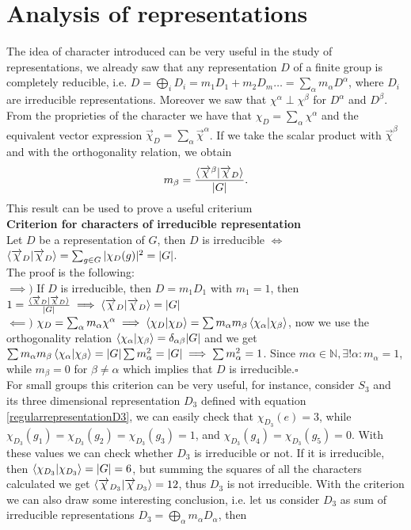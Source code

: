\documentclass[12pt]{book}
\theoremstyle{plain}
\theoremstyle{definition}
\theoremstyle{remark}
\begin{document}
\section{Analysis of representations}
The idea of character introduced can be very useful in the study of representations, we already saw that any representation $D$ of a finite group is completely reducible, i.e. $D = \bigoplus_i D_i = m_1 D_1 + m_2D_m \dots = \sum_\alpha m_\alpha D^\alpha$, where $D_i$ are irreducible representations. Moreover we saw that $\chi^\alpha \perp \chi^\beta$ for $D^\alpha$ and $D^\beta$. From the proprieties of the character we have that $\chi_D =\sum_\alpha \chi^\alpha$ and the equivalent vector expression $\overrightarrow{\chi}_D =\sum_\alpha \overrightarrow{\chi}^\alpha$. If we take the scalar product with $\overrightarrow{\chi}^\beta$ and with the orthogonality relation, we obtain
\[m_\beta = \frac{\braket{\overrightarrow{\chi}^\beta|\overrightarrow{\chi}_D}}{|G|}.\]
This result can be used to prove a useful criterium\\
\textbf{Criterion for characters of irreducible representation}\\Let $D$ be a representation of $G$, then $D$ is irreducible $\iff$ $\braket{\overrightarrow{\chi}_{D}|\overrightarrow{\chi}_{D}} = \sum_{g\in G}|\chi_D(g)|^2 = |G|$.\\ The proof is the following:\\
$\implies)$ If $D$ is irreducible, then $D = m_1 D_1$ with $m_1= 1$, then $1 = \frac{\braket{\overrightarrow{\chi}_D|\overrightarrow{\chi}_D}}{|G|} \implies \braket{\overrightarrow{\chi}_D|\overrightarrow{\chi}_D} = |G|$\\
$\impliedby)$ $\chi_D = \sum_\alpha m_\alpha\chi^\alpha \implies \braket{\chi_D|\chi_D} = \sum m_\alpha m_\beta \braket{\chi_\alpha|\chi_\beta}$, now we use the orthogonality relation $\braket{\chi_\alpha|\chi_\beta} = \delta_{\alpha\beta}|G|$ and we get $\sum m_\alpha m_\beta \braket{\chi_\alpha|\chi_\beta} = |G| \sum m_\alpha^2 = |G| \implies \sum m_\alpha^2 = 1$. Since $m\alpha\in \mathbb{N}, \exists! \alpha : m_\alpha = 1$, while $m_\beta = 0 $ for $\beta\neq \alpha$ which implies that $D$ is irreducible.\hfill\ensuremath{\square}\\
For small groups this criterion can be very useful, for instance, consider $S_3$ and its three dimensional representation $D_3$ defined with equation \eqref{regularrepresentationD3}, we can easily check that $\chi_{D_3}(e) = 3$, while $\chi_{D_3}(g_1) = \chi_{D_3}(g_2) = \chi_{D_3}(g_3)=1$, and $\chi_{D_3}(g_4) = \chi_{D_3}(g_5) = 0$. With these values we can check whether $D_3$ is irreducible or not. If it is irreducible, then $\braket{\chi_{D_3}|\chi_{D_3}} = |G| = 6$, but summing the squares of all the characters calculated we get $\braket{\overrightarrow{\chi}_{D_3}|\overrightarrow{\chi}_{D_3}} = 12$, thus $D_3$ is not irreducible. With the criterion we can also draw some interesting conclusion, i.e. let us consider $D_3$ as sum of irreducible representations $D_3 = \bigoplus_\alpha m_\alpha D_\alpha$, then
\end{document}
